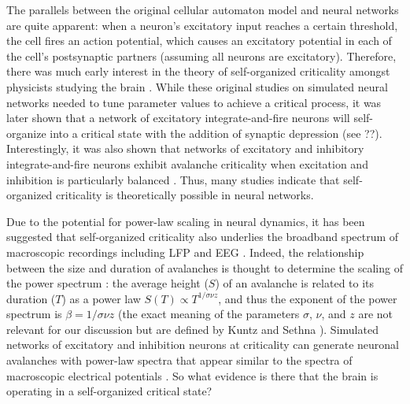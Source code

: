 The parallels between the original cellular automaton model and neural networks are quite apparent: when a neuron’s excitatory input reaches a certain threshold, the cell fires an action potential, which causes an excitatory potential in each of the cell’s postsynaptic partners (assuming all neurons are excitatory). Therefore, there was much early interest in the theory of self-organized criticality amongst physicists studying the brain \cite{Corral1995, Herz1995}. While these original studies on simulated neural networks needed to tune parameter values to achieve a critical process, it was later shown \cite{Levina2007} that a network of excitatory integrate-and-fire neurons will self-organize into a critical state with the addition of synaptic depression (see ??). Interestingly, it was also shown that networks of excitatory and inhibitory integrate-and-fire neurons exhibit avalanche criticality when excitation and inhibition is particularly balanced \cite{Poil2012, Lombardi2017}. Thus, many studies indicate that self-organized criticality is theoretically possible in neural networks.

Due to the potential for power-law scaling in neural dynamics, it has been suggested that self-organized criticality also underlies the broadband spectrum of macroscopic recordings including LFP and EEG \cite{Lombardi2017}. Indeed, the relationship between the size and duration of avalanches is thought to determine the scaling of the power spectrum \cite{Kuntz2000}: the average height ($S$) of an avalanche is related to its duration ($T$) as a power law $S(T)\propto T^{1/\sigma\nu z}$, and thus the exponent of the power spectrum is $\beta=1/\sigma\nu z$ (the exact meaning of the parameters $\sigma$, $\nu$, and $z$ are not relevant for our discussion but are defined by Kuntz and Sethna \cite{Kuntz2000}). Simulated networks of excitatory and inhibition neurons at criticality can generate neuronal avalanches with power-law spectra that appear similar to the spectra of macroscopic electrical potentials \cite{Lombardi2017}. So what evidence is there that the brain is operating in a self-organized critical state?

